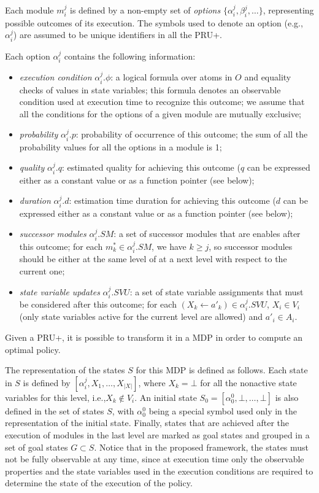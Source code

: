 Each module $m_i^j$ is defined by a non-empty set of \emph{options} $\{ \alpha_i^j, \beta_i^j, \ldots \}$, representing possible outcomes of its execution. The symbols used to denote an option (e.g., $\alpha_i^j$) are assumed to be unique identifiers in all the PRU+.

Each option $\alpha_i^j$ contains the following information:
\begin{itemize}
\item \emph{execution condition} $\alpha_i^j.\phi$: a logical formula over atoms in $O$ and equality checks of values in state variables; this formula denotes an observable condition used at execution time to recognize this outcome; we assume that all the conditions for the options of a given module are mutually exclusive;
\item \emph{probability} $\alpha_i^j.p$: probability of occurrence of this outcome; the sum of all the probability values for all the options in a module is 1;
\item \emph{quality} $\alpha_i^j.q$: estimated quality for achieving this outcome ($q$ can be expressed either as a constant value or as a function pointer (see below);
\item \emph{duration} $\alpha_i^j.d$: estimation time duration for achieving this outcome ($d$ can be expressed either as a constant value or as a function pointer (see below);
\item \emph{successor modules} $\alpha_i^j.SM$: a set of successor modules that are enables after this outcome; for each $m_k^* \in \alpha_i^j.SM$, we have $k \geq j$, so successor modules should be either at the same level of at a next level with respect to the current one;
\item \emph{state variable updates} $\alpha_i^j.SVU$: a set of state variable assignments that must be considered after this outcome; for each $(X_k \leftarrow a'_k) \in \alpha_i^j.SVU$, $X_i \in V_i$ (only state variables active for the current level are allowed) and  $a'_i \in A_i$.
\end{itemize}

Given a PRU+, it is possible to transform it in a MDP in order to compute an optimal policy.

The representation of the states $S$ for this MDP is defined as follows.
Each state in $S$ is defined by $[  \alpha_i^j, X_1, \ldots, X_{|X|} ]$, where
$X_k = \bot$ for all the nonactive state variables for this level, i.e.,$ X_k \notin V_i$.
An initial state $S_0 = [ \alpha_0^0, \bot, \ldots, \bot ]$ is also defined in the set of states $S$, with $\alpha_0^0$ being a special symbol used only in the representation of the initial state. Finally, states that are achieved after the execution of modules in the last level are marked as goal states and grouped in a set of goal states $G \subset S$.
Notice that in the proposed framework, the states must not be fully observable at any time, since at execution time only the observable properties and the state variables used in the execution conditions are required to determine the state of the execution of the policy.

